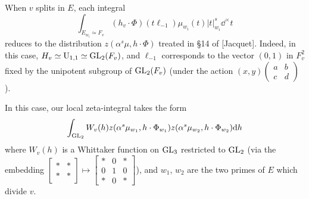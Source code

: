 When $v$ splits in $E$, each integral
\[
    \int_{E_{w_i} \simeq F_v} (h_v \cdot \Phi)(t \ell_{-1}) \mu_{w_i} (t) |t|_{w_i}^{s} \dd^\times t
\]
reduces to the distribution $z(\alpha^s\mu, h \cdot \Phi)$ treated in \S 14 of [Jacquet].
Indeed, in this case, $H_v \simeq \mathrm{U}_{1, 1} \simeq \mathrm{GL}_2(F_v)$, and $\ell_{-1}$ corresponds to the vector $(0, 1)$ in $F_v^2$ fixed by the unipotent subgroup of $\mathrm{GL}_2(F_v)$ (under the action $(x,y) \left(\begin{smallmatrix}
    a & b \\ c & d
\end{smallmatrix}\right)$).

In this case, our local zeta-integral takes the form
\[
    \int_{\mathrm{GL}_2} W_v(h) z(\alpha^s \mu_{w_1}, h\cdot \Phi_{w_1}) z(\alpha^s \mu_{w_2}, h \cdot \Phi_{w_2}) \mathrm{d} h
\]
where $W_v(h)$ is a Whittaker function on $\mathrm{GL}_3$ restricted to $\mathrm{GL}_2$ (via the embedding $\left[\begin{smallmatrix}
    * &* \\ * &* 
\end{smallmatrix}\right] \mapsto \left[\begin{smallmatrix} * & 0 & * \\ 0 & 1 & 0 \\ * &0 & * \end{smallmatrix}\right]$), and $w_1$, $w_2$ are the two primes of $E$ which divide $v$.